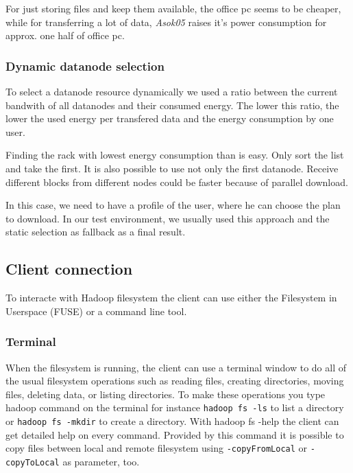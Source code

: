 For just storing files and keep them available, the office pc seems to be cheaper, while for transferring a lot of data, \textit{Asok05} raises it's power consumption for approx. one half of office pc.

\subsubsection{Dynamic datanode selection}

To select a datanode resource dynamically we used a ratio between the current bandwith of all datanodes and their consumed energy. The lower this ratio, the lower the used energy per transfered data and the energy consumption by one user.

Finding the rack with lowest energy consumption than is easy. Only sort the list and take the first. It is also possible to use not only the first datanode. Receive different blocks from different nodes could be faster because of parallel download.

In this case, we need to have a profile of the user, where he can choose the plan to download. In our test environment, we usually used this approach and the static selection as fallback as a final result.

\subsection{Client connection}
\label{sec:hdfs_client}

To interacte with Hadoop filesystem the client can use either the Filesystem in Userspace (FUSE) or a command line tool.

\subsubsection{Terminal}

When the filesystem is running, the client can use a terminal window to do all of the usual filesystem operations such as reading files, creating directories, moving files, deleting data, or listing directories. 
To make these operations you type hadoop command on the terminal for instance \texttt{hadoop fs -ls} to list a directory or \texttt{hadoop fs -mkdir} to create a directory. 
With hadoop fs -help the client can get detailed help on every command. 
Provided by this command it is possible to copy files between local and remote filesystem using \texttt{-copyFromLocal} or \texttt{-copyToLocal} as parameter, too.

